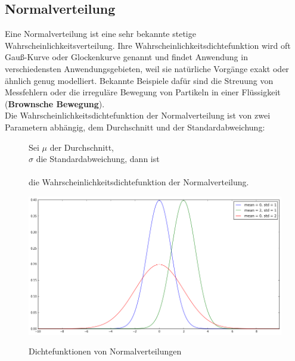         \subsection{Normalverteilung}

            Eine Normalverteilung ist eine sehr bekannte stetige Wahrscheinlichkeitsverteilung. Ihre Wahrscheinlichkeitsdichtefunktion wird oft Gauß-Kurve oder Glockenkurve genannt und findet Anwendung in verschiedensten Anwendungsgebieten, weil sie natürliche Vorgänge exakt oder ähnlich genug modelliert. Bekannte Beispiele dafür sind die Streuung von Messfehlern oder die irreguläre Bewegung von Partikeln in einer Flüssigkeit (\textbf{Brownsche Bewegung}).\\

            \noindent
            Die Wahrscheinlichkeitsdichtefunktion der Normalverteilung ist von zwei Parametern abhängig, dem Durchschnitt und der Standardabweichung:

            \begin{figure}[H]
                \begin{mdframed}
                    \noindent
                    Sei $\mu$ der Durchschnitt,\\
                    \hspace*{4.5mm}    $\sigma$ die Standardabweichung, dann ist\\[4mm]
                    \hspace*{50mm}  \\[4mm]
                    \hspace*{4.5mm} die Wahrscheinlichkeitsdichtefunktion der Normalverteilung.
                \end{mdframed}
            \end{figure}

            \begin{figure}[H]
                    \begin{center}
                        \includegraphics[scale=0.4]{../pictures/diagrams/normal-dist-example.png}\\
                        \caption{Dichtefunktionen von Normalverteilungen}\label{fig:norm-dist-pdf}
                    \end{center}
            \end{figure}

